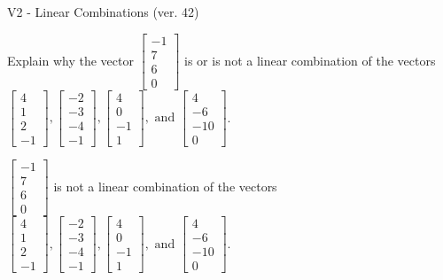 \begin{exercise}
  \begin{exerciseTitle}V2 - Linear Combinations (ver. 42)\end{exerciseTitle}
  \begin{exerciseStatement}
    Explain why the vector \(\left[\begin{array}{c}
-1 \\
7 \\
6 \\
0
\end{array}\right]\)  is or is not a linear 
	combination of the vectors \(\left[\begin{array}{c}
4 \\
1 \\
2 \\
-1
\end{array}\right] , \left[\begin{array}{c}
-2 \\
-3 \\
-4 \\
-1
\end{array}\right] , \left[\begin{array}{c}
4 \\
0 \\
-1 \\
1
\end{array}\right] , \text{ and } \left[\begin{array}{c}
4 \\
-6 \\
-10 \\
0
\end{array}\right]\).
	


  \end{exerciseStatement}
  \begin{exerciseAnswer}
   \(\left[\begin{array}{c}
-1 \\
7 \\
6 \\
0
\end{array}\right]\) 
  	 is not  
	a linear combination of the vectors \(\left[\begin{array}{c}
4 \\
1 \\
2 \\
-1
\end{array}\right] , \left[\begin{array}{c}
-2 \\
-3 \\
-4 \\
-1
\end{array}\right] , \left[\begin{array}{c}
4 \\
0 \\
-1 \\
1
\end{array}\right] , \text{ and } \left[\begin{array}{c}
4 \\
-6 \\
-10 \\
0
\end{array}\right]\).


\end{exerciseAnswer}
\end{exercise}
